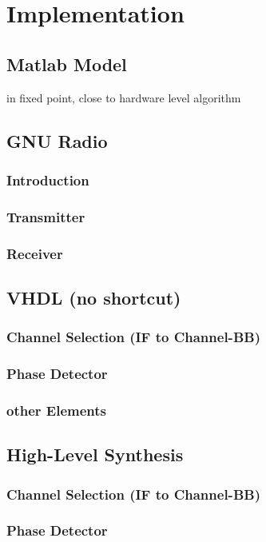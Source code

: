\chapter{Implementation}
\label{cha:Implementation}
\section{Matlab Model}
in fixed point, close to hardware level algorithm

\section{GNU Radio}
  \subsection{Introduction}
  \subsection{Transmitter}
  \subsection{Receiver}

\section{VHDL (no shortcut)}
  \subsection{Channel Selection (IF to Channel-BB)}
  \subsection{Phase Detector}
  \subsection{other Elements}

\section{High-Level Synthesis}
  \subsection{Channel Selection (IF to Channel-BB)}
  \subsection{Phase Detector}
